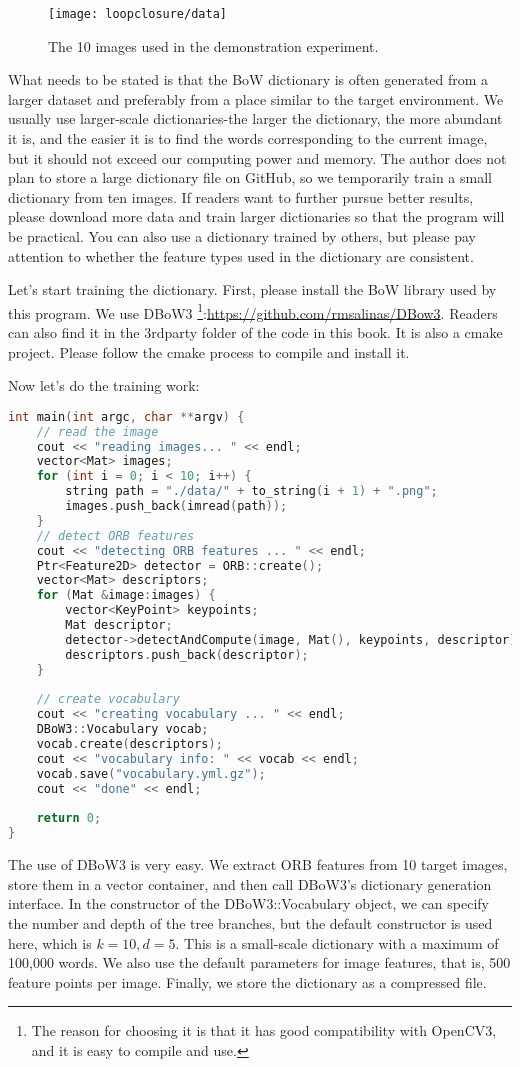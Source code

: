 \begin{figure}[!htp]
	\centering
	\texttt{[image: loopclosure/data]}
	\caption{The 10 images used in the demonstration experiment.}
	\label{fig:lp-data}
\end{figure}

What needs to be stated is that the BoW dictionary is often generated from a larger dataset and preferably from a place similar to the target environment. We usually use larger-scale dictionaries-the larger the dictionary, the more abundant it is, and the easier it is to find the words corresponding to the current image, but it should not exceed our computing power and memory. The author does not plan to store a large dictionary file on GitHub, so we temporarily train a small dictionary from ten images. If readers want to further pursue better results, please download more data and train larger dictionaries so that the program will be practical. You can also use a dictionary trained by others, but please pay attention to whether the feature types used in the dictionary are consistent.

Let's start training the dictionary. First, please install the BoW library used by this program. We use DBoW3 \footnote{The reason for choosing it is that it has good compatibility with OpenCV3, and it is easy to compile and use. }:\url{https://github.com/rmsalinas/DBow3}. Readers can also find it in the 3rdparty folder of the code in this book. It is also a cmake project. Please follow the cmake process to compile and install it.

Now let's do the training work: 
\begin{lstlisting}[language=c++,caption=slambook2/ch11/feature\_training.cpp]
int main(int argc, char **argv) {
	// read the image 
	cout << "reading images... " << endl;
	vector<Mat> images;
	for (int i = 0; i < 10; i++) {
		string path = "./data/" + to_string(i + 1) + ".png";
		images.push_back(imread(path));
	}
	// detect ORB features
	cout << "detecting ORB features ... " << endl;
	Ptr<Feature2D> detector = ORB::create();
	vector<Mat> descriptors;
	for (Mat &image:images) {
		vector<KeyPoint> keypoints;
		Mat descriptor;
		detector->detectAndCompute(image, Mat(), keypoints, descriptor);
		descriptors.push_back(descriptor);
	}
	
	// create vocabulary 
	cout << "creating vocabulary ... " << endl;
	DBoW3::Vocabulary vocab;
	vocab.create(descriptors);
	cout << "vocabulary info: " << vocab << endl;
	vocab.save("vocabulary.yml.gz");
	cout << "done" << endl;
	
	return 0;
}
\end{lstlisting}
The use of DBoW3 is very easy. We extract ORB features from 10 target images, store them in a vector container, and then call DBoW3's dictionary generation interface. In the constructor of the DBoW3::Vocabulary object, we can specify the number and depth of the tree branches, but the default constructor is used here, which is $k=10,d=5$. This is a small-scale dictionary with a maximum of 100,000 words. We also use the default parameters for image features, that is, 500 feature points per image. Finally, we store the dictionary as a compressed file.

